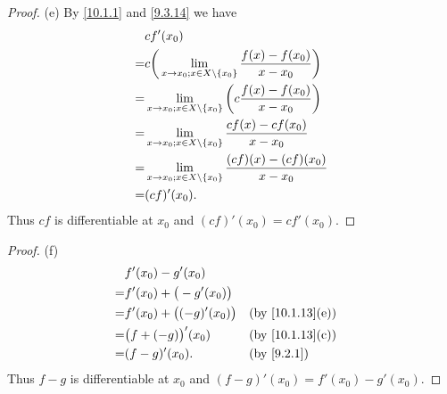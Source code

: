 \begin{proof}{(e)}
  By \cref{10.1.1} and \cref{9.3.14} we have
  \begin{align*}
      & cf'(x_0)                                                                                    \\
    = & c \bigg(\lim_{x \to x_0 ; x \in X \setminus \left\lbrace x_0\right\rbrace} \dfrac{f(x) - f(x_0)}{x - x_0}\bigg) \\
    = & \lim_{x \to x_0 ; x \in X \setminus \left\lbrace x_0\right\rbrace} \bigg(c \dfrac{f(x) - f(x_0)}{x - x_0}\bigg) \\
    = & \lim_{x \to x_0 ; x \in X \setminus \left\lbrace x_0\right\rbrace} \dfrac{cf(x) - cf(x_0)}{x - x_0}             \\
    = & \lim_{x \to x_0 ; x \in X \setminus \left\lbrace x_0\right\rbrace} \dfrac{(cf)(x) - (cf)(x_0)}{x - x_0}         \\
    = & (cf)'(x_0).
  \end{align*}
  Thus \(cf\) is differentiable at \(x_0\) and \((cf)'(x_0) = cf'(x_0)\).
\end{proof}

\begin{proof}{(f)}
  \begin{align*}
      & f'(x_0) - g'(x_0)                                                 \\
    = & f'(x_0) + \big(-g'(x_0)\big)                                      \\
    = & f'(x_0) + \big((-g)'(x_0)\big) &  & \text{(by \cref{10.1.13}(e))} \\
    = & \big(f + (-g)\big)'(x_0)       &  & \text{(by \cref{10.1.13}(c))} \\
    = & (f - g)'(x_0).                 &  & \by{9.2.1}
  \end{align*}
  Thus \(f - g\) is differentiable at \(x_0\) and \((f - g)'(x_0) = f'(x_0) - g'(x_0)\).
\end{proof}

